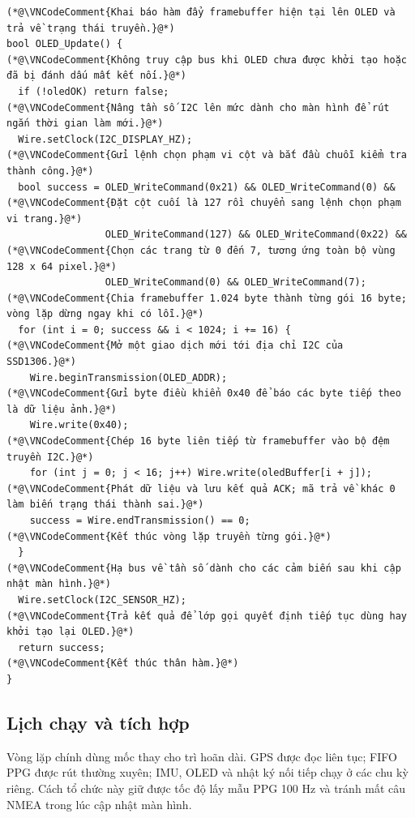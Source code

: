 \documentclass[12pt]{article}
\begin{document}
\Needspace{0.38\textheight}
\begin{lstlisting}[style=firmware,caption={Truyền framebuffer và trả bus về tốc độ cảm biến}]
(*@\VNCodeComment{Khai báo hàm đẩy framebuffer hiện tại lên OLED và trả về trạng thái truyền.}@*)
bool OLED_Update() {
(*@\VNCodeComment{Không truy cập bus khi OLED chưa được khởi tạo hoặc đã bị đánh dấu mất kết nối.}@*)
  if (!oledOK) return false;
(*@\VNCodeComment{Nâng tần số I2C lên mức dành cho màn hình để rút ngắn thời gian làm mới.}@*)
  Wire.setClock(I2C_DISPLAY_HZ);
(*@\VNCodeComment{Gửi lệnh chọn phạm vi cột và bắt đầu chuỗi kiểm tra thành công.}@*)
  bool success = OLED_WriteCommand(0x21) && OLED_WriteCommand(0) &&
(*@\VNCodeComment{Đặt cột cuối là 127 rồi chuyển sang lệnh chọn phạm vi trang.}@*)
                 OLED_WriteCommand(127) && OLED_WriteCommand(0x22) &&
(*@\VNCodeComment{Chọn các trang từ 0 đến 7, tương ứng toàn bộ vùng 128 x 64 pixel.}@*)
                 OLED_WriteCommand(0) && OLED_WriteCommand(7);
(*@\VNCodeComment{Chia framebuffer 1.024 byte thành từng gói 16 byte; vòng lặp dừng ngay khi có lỗi.}@*)
  for (int i = 0; success && i < 1024; i += 16) {
(*@\VNCodeComment{Mở một giao dịch mới tới địa chỉ I2C của SSD1306.}@*)
    Wire.beginTransmission(OLED_ADDR);
(*@\VNCodeComment{Gửi byte điều khiển 0x40 để báo các byte tiếp theo là dữ liệu ảnh.}@*)
    Wire.write(0x40);
(*@\VNCodeComment{Chép 16 byte liên tiếp từ framebuffer vào bộ đệm truyền I2C.}@*)
    for (int j = 0; j < 16; j++) Wire.write(oledBuffer[i + j]);
(*@\VNCodeComment{Phát dữ liệu và lưu kết quả ACK; mã trả về khác 0 làm biến trạng thái thành sai.}@*)
    success = Wire.endTransmission() == 0;
(*@\VNCodeComment{Kết thúc vòng lặp truyền từng gói.}@*)
  }
(*@\VNCodeComment{Hạ bus về tần số dành cho các cảm biến sau khi cập nhật màn hình.}@*)
  Wire.setClock(I2C_SENSOR_HZ);
(*@\VNCodeComment{Trả kết quả để lớp gọi quyết định tiếp tục dùng hay khởi tạo lại OLED.}@*)
  return success;
(*@\VNCodeComment{Kết thúc thân hàm.}@*)
}
\end{lstlisting}

\subsection{Lịch chạy và tích hợp}

Vòng lặp chính dùng mốc  thay cho trì hoãn dài. GPS được đọc liên tục; FIFO PPG được rút thường xuyên; IMU, OLED và nhật ký nối tiếp chạy ở các chu kỳ riêng. Cách tổ chức này giữ được tốc độ lấy mẫu PPG 100 Hz và tránh mất câu NMEA trong lúc cập nhật màn hình.
\end{document}
